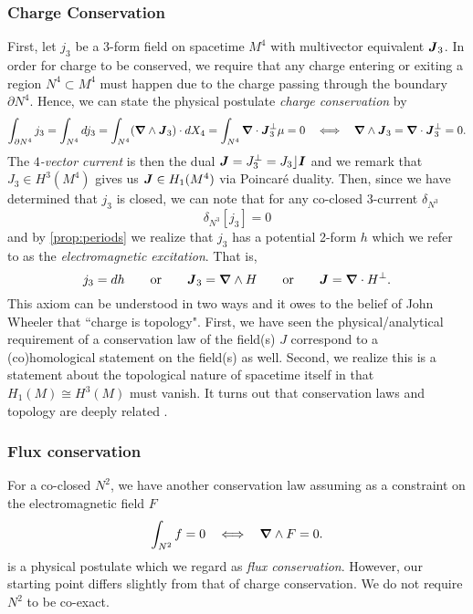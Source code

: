 \documentclass{article}
\begin{document}
\subsubsection{Charge Conservation}
First, let $j_3$ be a 3-form field on spacetime $M^4$ with multivector equivalent $\boldsymbol{J}_3$. In order for charge to be conserved, we require that any charge entering or exiting a region $N^4 \subset M^4$ must happen due to the charge passing through the boundary $\partial N^4$. Hence, we can state the physical postulate \emph{charge conservation} by
\begin{equation}
    \label{eq:topological_charge_conservation}
    \int_{\partial N^4} j_3 = \int_{N^4} dj_3= \int_{N^4} (\boldsymbol{\nabla} \wedge \boldsymbol{J}_3) \cdot dX_4 = \int_{N^4} \boldsymbol{\nabla} \cdot \boldsymbol{J}_3^\perp \mu = 0    ~~\iff~~ \boldsymbol{\nabla} \wedge \boldsymbol{J}_3=\boldsymbol{\nabla} \cdot \boldsymbol{J}_3^\perp = 0.
\end{equation}
The \emph{$4$-vector current} is then the dual $\boldsymbol{J} = J_3^\perp=J_3 \rfloor \boldsymbol{I}$ and we remark that $J_3 \in H^3(M^4)$ gives us $\boldsymbol{J} \in H_1(M^4)$ via Poincar\'e duality. Then, since we have determined that $j_3$ is closed, we can note that for any co-closed $3$-current $\delta_{N^3}$
\begin{equation}
    \delta_{N^3}[j_3] = 0
\end{equation}
and by \cref{prop:periods} we realize that $j_3$ has a potential 2-form $h$ which we refer to as the \emph{electromagnetic excitation}. That is, 
\begin{equation}
\label{eq:current_from_excitation}
    j_3=dh \qquad \textrm{or} \qquad \boldsymbol{J}_3 = \boldsymbol{\nabla} \wedge H \qquad \textrm{or} \qquad \boldsymbol{J} = \boldsymbol{\nabla} \cdot H^\perp.
\end{equation}
This axiom can be understood in two ways and it owes to the belief of John Wheeler that ``charge is topology". First, we have seen the physical/analytical requirement of a conservation law of the field(s) $J$ correspond to a (co)homological statement on the field(s) as well.  Second, we realize this is a statement about the topological nature of spacetime itself in that $H_1(M)\cong H^3(M)$ must vanish. It turns out that conservation laws and topology are deeply related \cite{westenholz_topological_1979}.

\subsubsection{Flux conservation}

For a co-closed $N^2$, we have another conservation law assuming as a constraint on the electromagnetic field $F$
\begin{equation}
    \label{eq:magnetic_flux_conservation}
    \int_{N^2} f = 0  ~~\iff~~ \boldsymbol{\nabla} \wedge F=0.
\end{equation}
is a physical postulate which we regard as \emph{flux conservation}. However, our starting point differs slightly from that of charge conservation. We do not require $N^2$ to be co-exact. 
\end{document}
